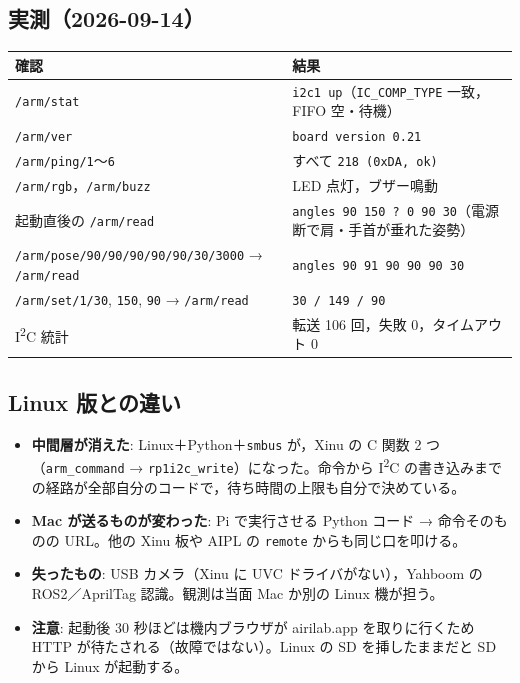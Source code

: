 \documentclass[a4paper,11pt]{article}
\begin{document}
\subsection*{実測（2026-09-14）}
\begin{center}\footnotesize
\begin{tabular}{@{}p{}p{}@{}}
\toprule
確認 & 結果 \\
\midrule
\texttt{/arm/stat} & \texttt{i2c1 up}（\texttt{IC\_COMP\_TYPE} 一致，FIFO 空・待機） \\
\texttt{/arm/ver} & \texttt{board version 0.21} \\
\texttt{/arm/ping/1}〜\texttt{6} & すべて \texttt{218 (0xDA, ok)} \\
\texttt{/arm/rgb}，\texttt{/arm/buzz} & LED 点灯，ブザー鳴動 \\
起動直後の \texttt{/arm/read} & \texttt{angles 90 150 ? 0 90 30}（電源断で肩・手首が垂れた姿勢） \\
\texttt{/arm/pose/90/90/90/90/90/30/3000} → \texttt{/arm/read} & \texttt{angles 90 91 90 90 90 30} \\
\texttt{/arm/set/1/30}, \texttt{150}, \texttt{90} → \texttt{/arm/read} & \texttt{30 / 149 / 90} \\
I\textsuperscript{2}C 統計 & 転送 106 回，失敗 0，タイムアウト 0 \\
\bottomrule
\end{tabular}
\end{center}

\subsection*{Linux 版との違い}
\begin{itemize}
  \item \textbf{中間層が消えた}: Linux＋Python＋\texttt{smbus} が，Xinu の C 関数 2 つ（\texttt{arm\_command} → \texttt{rp1i2c\_write}）になった。命令から I\textsuperscript{2}C の書き込みまでの経路が全部自分のコードで，待ち時間の上限も自分で決めている。
  \item \textbf{Mac が送るものが変わった}: Pi で実行させる Python コード → 命令そのものの URL。他の Xinu 板や AIPL の \texttt{remote} からも同じ口を叩ける。
  \item \textbf{失ったもの}: USB カメラ（Xinu に UVC ドライバがない），Yahboom の ROS2／AprilTag 認識。観測は当面 Mac か別の Linux 機が担う。
  \item \textbf{注意}: 起動後 30 秒ほどは機内ブラウザが airilab.app を取りに行くため HTTP が待たされる（故障ではない）。Linux の SD を挿したままだと SD から Linux が起動する。
\end{itemize}
\end{document}
